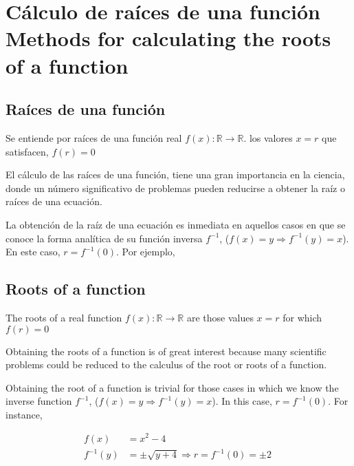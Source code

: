\chapter{Cálculo de raíces de una función\\ Methods for calculating the roots of a function }


\begin{paracol}{2}
\section{Raíces de una función}
Se entiende por raíces de una función real $f(x):\mathbb{R} \rightarrow \mathbb{R}$. los valores $x=r$ que satisfacen, $f(r)=0$

El cálculo de las raíces de una función, tiene una gran importancia en la ciencia, donde un número significativo de problemas pueden reducirse a obtener la raíz o raíces de una ecuación.

La obtención de la raíz de una ecuación es inmediata en aquellos casos en que se conoce la forma analítica de su función inversa $f^{-1}$, ($f(x)=y\Rightarrow f^{-1}(y)=x$). En este caso, $r=f^{-1}(0)$. Por ejemplo,
\switchcolumn
\section{Roots of a function}
The roots of a real function $f(x):\mathbb{R} \rightarrow \mathbb{R}$ are those values $x = r $ for which $f(r) = 0$

Obtaining the roots of a function is of great interest because many scientific problems could be reduced to the calculus of the root or roots of a function.

Obtaining the root of a function is trivial for those cases in which we know the inverse function $f^{-1}$, ($f(x)=y\Rightarrow f^{-1}(y)=x$). In this case, $r=f^{-1}(0)$. For instance,  
\end{paracol}

\begin{align*}
f(x)&=x^2-4\\
f^{-1}(y)&=\pm\sqrt{y+4}\Rightarrow r=f^{-1}(0)=\pm 2\
\end{align*}

